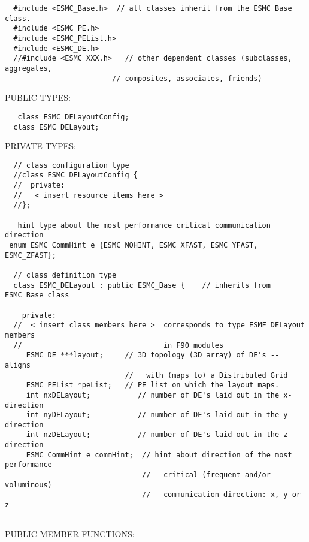 \begin{verbatim}  #include <ESMC_Base.h>  // all classes inherit from the ESMC Base class.
  #include <ESMC_PE.h>  
  #include <ESMC_PEList.h>  
  #include <ESMC_DE.h>  
  //#include <ESMC_XXX.h>   // other dependent classes (subclasses, aggregates,
                         // composites, associates, friends)
 \end{verbatim}{\sf PUBLIC TYPES:}
\begin{verbatim}   class ESMC_DELayoutConfig;
  class ESMC_DELayout;
 \end{verbatim}{\sf PRIVATE TYPES:}
\begin{verbatim} 
  // class configuration type
  //class ESMC_DELayoutConfig {
  //  private:
  //   < insert resource items here >
  //};
 
   hint type about the most performance critical communication direction
 enum ESMC_CommHint_e {ESMC_NOHINT, ESMC_XFAST, ESMC_YFAST, ESMC_ZFAST};
 
  // class definition type
  class ESMC_DELayout : public ESMC_Base {    // inherits from ESMC_Base class
 
    private:
  //  < insert class members here >  corresponds to type ESMF_DELayout members
  //                                 in F90 modules
     ESMC_DE ***layout;     // 3D topology (3D array) of DE's -- aligns
                            //   with (maps to) a Distributed Grid
     ESMC_PEList *peList;   // PE list on which the layout maps. 
     int nxDELayout;           // number of DE's laid out in the x-direction
     int nyDELayout;           // number of DE's laid out in the y-direction
     int nzDELayout;           // number of DE's laid out in the z-direction
     ESMC_CommHint_e commHint;  // hint about direction of the most performance
                                //   critical (frequent and/or voluminous)
                                //   communication direction: x, y or z
                             
 \end{verbatim}{\sf PUBLIC MEMBER FUNCTIONS:}
